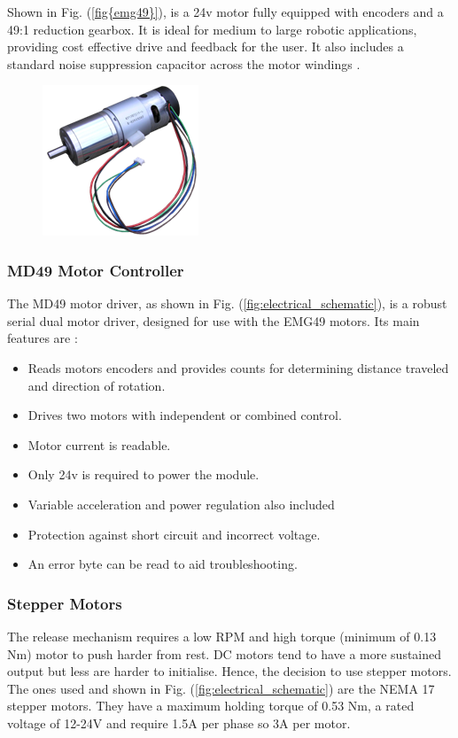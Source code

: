\documentclass[11pt,landscape]{article}
\begin{document}
\begin{multicols}{3}
Shown in Fig. (\ref{fig{emg49}}), is a 24v motor fully equipped with
encoders and a 49:1 reduction gearbox. It is ideal for medium to large robotic
applications, providing cost effective drive and feedback for the user. It also
includes a standard noise suppression capacitor across the motor windings
\cite{emg49data}.
\begin{figure}[H]
    \begin{center}
    \includegraphics[]{emg49.png}
    \label{fig:emg49}
    \end{center}
\end{figure}

\subsubsection{MD49 Motor Controller}
The MD49 motor driver, as shown in Fig. (\ref{fig:electrical_schematic}), is a
robust serial dual motor driver, designed for use with the EMG49 motors. Its
main features are \cite{md49data}:

\begin{itemize}
    \item Reads motors encoders and provides counts for determining distance traveled and direction of rotation.
    \item Drives two motors with independent or combined control. 
    \item Motor current is readable.
    \item Only 24v is required to power the module.
    \item Variable acceleration and power regulation also included
    \item Protection against short circuit and incorrect voltage. 
    \item An error byte can be read to aid troubleshooting.
\end{itemize}

\subsubsection{Stepper Motors}
The release mechanism requires a low RPM and high torque (minimum of 0.13 Nm)
motor to push harder from rest. DC motors tend to have a more sustained output
but less are harder to initialise. Hence, the decision to use stepper motors.
The ones used and shown in Fig. (\ref{fig:electrical_schematic}) are the NEMA 17
stepper motors. They have a maximum holding torque of 0.53 Nm, a rated voltage
of 12-24V and require 1.5A per phase so 3A per motor. 


\end{multicols}
\end{document}
